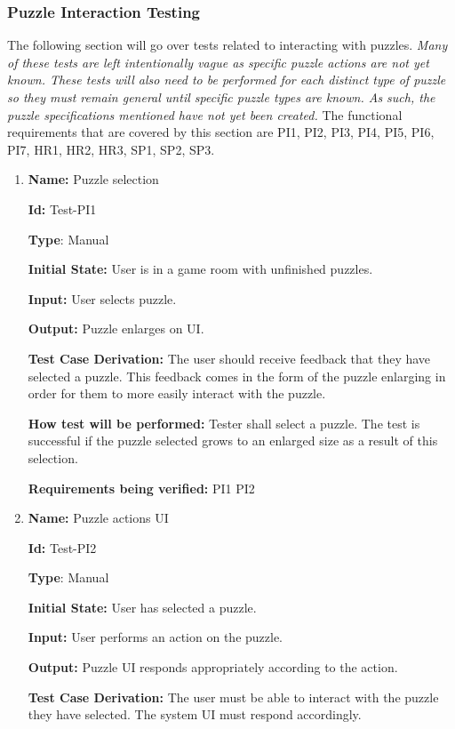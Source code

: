 \documentclass[12pt, titlepage]{article}
\begin{document}
\subsubsection{Puzzle Interaction Testing}
The following section will go over tests related to interacting with puzzles.
\textit{Many of these tests are left intentionally vague as specific puzzle actions are not yet known. These tests will also need to be performed for each distinct type of puzzle so they must remain general until specific puzzle types are known. As such, the puzzle specifications mentioned have not yet been created. } The functional requirements that are covered by this section are PI1, PI2, PI3, PI4, PI5, PI6, PI7, HR1, HR2, HR3, SP1, SP2, SP3.

\begin{enumerate}

\item{\textbf{Name:} Puzzle selection}

\textbf{Id:} Test-PI1

\textbf{Type}: Manual

\textbf{Initial State:} User is in a game room with unfinished puzzles.

\textbf{Input:} User selects puzzle.

\textbf{Output:} Puzzle enlarges on UI.

\textbf{Test Case Derivation:}
The user should receive feedback that they have selected a puzzle. This feedback comes in the form of the puzzle enlarging in order for them to more easily interact with the puzzle. 

\textbf{How test will be performed:}
Tester shall select a puzzle. The test is successful if the puzzle selected grows to an enlarged size as a result of this selection.

\textbf{Requirements being verified: } PI1 PI2

\item{\textbf{Name:} Puzzle actions UI}

\textbf{Id:} Test-PI2

\textbf{Type}: Manual

\textbf{Initial State:} User has selected a puzzle.

\textbf{Input:} User performs an action on the puzzle.

\textbf{Output:} Puzzle UI responds appropriately according to the action.

\textbf{Test Case Derivation:}
The user must be able to interact with the puzzle they have selected. The system UI must respond accordingly.


\end{enumerate}
\end{document}
